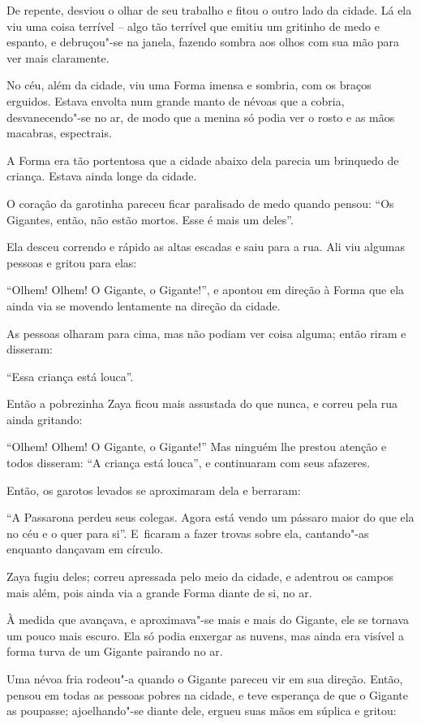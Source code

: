 De repente, desviou o olhar de seu trabalho e fitou o outro lado da
cidade. Lá ela viu uma coisa terrível -- algo tão terrível que emitiu um
gritinho de medo e espanto, e debruçou"-se na janela, fazendo sombra aos
olhos com sua mão para ver mais claramente.

No céu, além da cidade, viu uma Forma imensa e sombria, com os braços
erguidos. Estava envolta num grande manto de névoas que a cobria,
desvanecendo"-se no ar, de modo que a menina só podia ver o rosto e as
mãos macabras, espectrais.

A Forma era tão portentosa que a cidade abaixo dela parecia um brinquedo
de criança. Estava ainda longe da cidade.

O coração da garotinha pareceu ficar paralisado de medo quando pensou:
``Os Gigantes, então, não estão mortos. Esse é mais um deles''.

Ela desceu correndo e rápido as altas escadas e saiu para a rua. Ali
viu algumas pessoas e gritou para elas:

``Olhem! Olhem! O Gigante, o Gigante!'', e apontou em direção à Forma
que ela ainda via se movendo lentamente na direção da cidade.

As pessoas olharam para cima, mas não podiam ver coisa alguma; então
riram e disseram:

``Essa criança está louca''.

Então a pobrezinha Zaya ficou mais assustada do que nunca, e correu pela
rua ainda gritando:

``Olhem! Olhem! O Gigante, o Gigante!'' Mas ninguém lhe prestou atenção
e todos disseram: ``A criança está louca'', e continuaram com seus
afazeres.

Então, os garotos levados se aproximaram dela e berraram:

``A Passarona perdeu seus colegas. Agora está vendo um pássaro maior do
que ela no céu e o quer para si''. E~ficaram a fazer trovas sobre ela,
cantando"-as enquanto dançavam em círculo.

Zaya fugiu deles; correu apressada pelo meio da cidade, e adentrou os
campos mais além, pois ainda via a grande Forma diante de si, no ar.

À medida que avançava, e aproximava"-se mais e mais do Gigante, ele se
tornava um pouco mais escuro. Ela só podia enxergar as nuvens, mas ainda
era visível a forma turva de um Gigante pairando no ar.

Uma névoa fria rodeou"-a quando o Gigante pareceu vir em sua direção.
Então, pensou em todas as pessoas pobres na cidade, e teve esperança de
que o Gigante as poupasse; ajoelhando"-se diante dele, ergueu suas mãos
em súplica e gritou:

